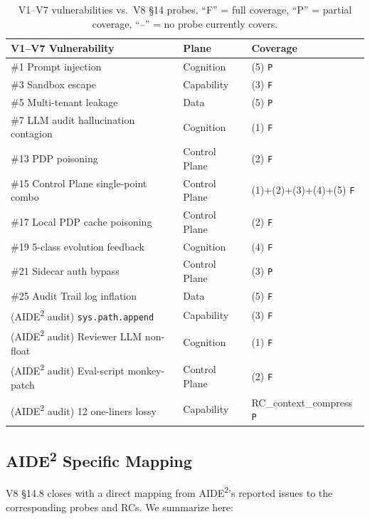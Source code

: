 \documentclass{article}
\theoremstyle{definition}
\begin{document}
\begin{table}[h]
\centering
\caption{V1--V7 vulnerabilities vs.\ V8 \S14 probes. ``F'' = full coverage, ``P'' = partial coverage, ``--'' = no probe currently covers.}
\label{tab:threat-coverage}
\begin{tabular}{lll}
\toprule
V1--V7 Vulnerability & Plane & Coverage \\
\midrule
\#1 Prompt injection & Cognition & (5) \texttt{P} \\
\#3 Sandbox escape & Capability & (3) \texttt{F} \\
\#5 Multi-tenant leakage & Data & (5) \texttt{P} \\
\#7 LLM audit hallucination contagion & Cognition & (1) \texttt{F} \\
\#13 PDP poisoning & Control Plane & (2) \texttt{F} \\
\#15 Control Plane single-point combo & Control Plane & (1)+(2)+(3)+(4)+(5) \texttt{F} \\
\#17 Local PDP cache poisoning & Control Plane & (2) \texttt{F} \\
\#19 5-class evolution feedback & Cognition & (4) \texttt{F} \\
\#21 Sidecar auth bypass & Control Plane & (3) \texttt{P} \\
\#25 Audit Trail log inflation & Data & (5) \texttt{F} \\
(AIDE\textsuperscript{2} audit) \texttt{sys.path.append} & Capability & (3) \texttt{F} \\
(AIDE\textsuperscript{2} audit) Reviewer LLM non-float & Cognition & (1) \texttt{F} \\
(AIDE\textsuperscript{2} audit) Eval-script monkey-patch & Control Plane & (2) \texttt{F} \\
(AIDE\textsuperscript{2} audit) 12 one-liners lossy & Capability & RC\_context\_compress \texttt{P} \\
\bottomrule
\end{tabular}
\end{table}

\subsection{AIDE\textsuperscript{2} Specific Mapping}

V8 \S14.8 closes with a direct mapping from AIDE\textsuperscript{2}'s reported issues to the corresponding probes and RCs. We summarize here:
\end{document}
